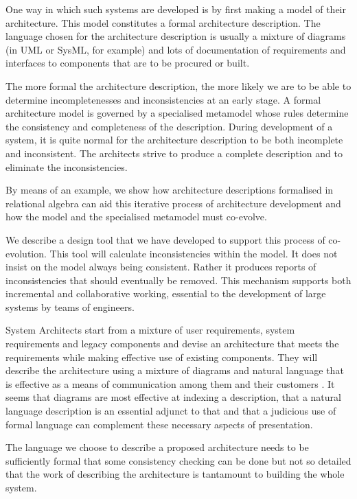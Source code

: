 \documentclass[times, 10pt,twocolumn]{article}
\begin{document}
One way in which such systems are developed is by first making a model of their architecture. This model constitutes a formal  architecture description. The language chosen for the architecture description is usually a mixture of diagrams (in UML or SysML, for example) and lots of documentation of requirements and interfaces to components that are to be procured or built.

The more formal the architecture description, the more likely we are to be able to determine incompletenesses and inconsistencies at an early stage. A formal architecture model is governed by a specialised metamodel whose rules determine the consistency and completeness of the description. During development of  a system, it is quite normal for the architecture  description to be both incomplete and inconsistent.  The architects strive to produce a complete  description and to eliminate the inconsistencies. 

By  means of an example, we show how architecture descriptions formalised in relational algebra can aid this iterative process of architecture development and how the  model and the specialised metamodel must co-evolve. 

We describe a  design tool that we have developed to support this  process of co-evolution. This tool will calculate inconsistencies within the model. It does not insist on the model always being consistent. Rather it produces reports of inconsistencies that should eventually be removed. This mechanism supports both incremental and collaborative working, essential to the development of large systems by teams of engineers.

\noindent System Architects start from a mixture of user requirements, system requirements and legacy components and devise an architecture that meets the requirements while making effective use of existing components. They will describe the architecture using a mixture of diagrams and natural language that is effective as a means of communication among them and their customers \cite{Gokhale,Henderson1,Henderson2, Kruchten,Maier,Rozanski,Shaw,Shaw1}. It seems that diagrams are most effective at indexing a description, that a natural language description is an essential adjunct to that and that a judicious use of formal language can complement these necessary aspects of presentation.

The language we choose to describe a proposed architecture needs to be sufficiently formal that some consistency checking can be done but not so detailed that the work of describing the architecture is tantamount to building the whole system.
\end{document}
